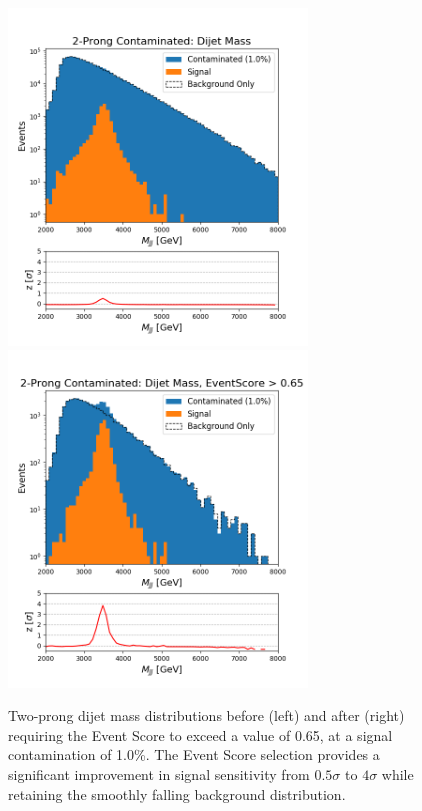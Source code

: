 \documentclass[12pt, a4paper]{article}
\begin{document}
\begin{figure}[H]
	\begin{center}
		\includegraphics[width=225pt]{imgs/bugfix/2Prong_Contaminated_1p0_JJ_Mass_Multi_SaveForPaper_Lead.png}
		\includegraphics[width=225pt]{imgs/bugfix/2Prong_Contaminated_1p0_JJ_Mass_EventScore0p65_Multi_SaveForPaper_Lead.png}
	\end{center}
	\caption{Two-prong dijet mass distributions before (left) and after (right) requiring the Event Score to exceed a value of 0.65, at a signal contamination of 1.0\%. The Event Score selection provides a significant improvement in signal sensitivity from $0.5\sigma$ to $4\sigma$ while retaining the smoothly falling background distribution.}
	\label{fig:2p_dijet}
\end{figure}
\end{document}
